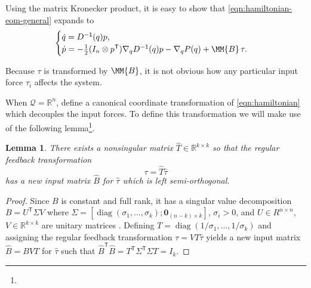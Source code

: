 \documentclass[journal,twoside,web, twocolumn,draftcls]{ieeecolor}
\newtheorem{lemma}{Lemma} %
\newtheorem{assm}{Assumption} %
\DeclareMathOperator{\Diag}{diag}
\newcommand*{\diag}[1]{\Diag\left(#1\right)}
\newcommand*{\tpose}{^\mathsf{T}}
\newcommand*{\inv}{^\mathsf{-1}}
\newcommand*{\R}{\mathbb{R}}
\newcommand*{\Id}[1]{I_{#1}}
\newcommand*{\Zmat}[1]{\bm{0}_{#1}}
\begin{document}
Using the matrix Kronecker product, it is easy to show that
\eqref{eqn:hamiltonian-eom-general} expands to
\begin{equation*}\label{eqn:hamiltonian-full-dynamics}
     \begin{cases}
        \dot{q} = D\inv(q)p 
        , \\
        \dot{p} = -\frac{1}{2} (\Id{n} \otimes p\tpose) \nabla_q D\inv(q) p
        - \nabla_q P(q) + \MM{B} \,\tau
        . \\
    \end{cases}
\end{equation*}

Because \(\tau\) is transformed by \(\MM{B}\), it is not obvious how any
particular input force \(\tau_i\) affects the system.

%
When \(\mathcal{Q} = \R^n\),  define a
canonical coordinate transformation of \eqref{eqn:hamiltonian} 
which decouples the input forces. To define this transformation we will make use of the following lemma\footnote{}.

\begin{lemma}\label{lemma:B-orthogonal}
There exists a nonsingular matrix \(\hat{T} \in \R^{k \times k}\) 
    so that the regular feedback transformation 
    \[
        \tau = \hat{T} \hat{\tau}
    \] 
    has a new input matrix \(\hat{B}\) for \(\hat{\tau}\) which is left
    semi-orthogonal.  
\end{lemma}
\begin{proof}
    Since \(B\) is constant and full rank, it has a singular value decomposition 
    \(B = U\tpose \Sigma V\) where 
    \(\Sigma = [\diag{\sigma_1,\ldots,\sigma_k}; \Zmat{(n-k)\times k}]\),
    \(\sigma_i > 0\), and \(U \in R^{n \times n}\),
    \(V \in \R^{k \times k}\) are unitary matrices \cite{calculating_svd}.
    Defining \(T = \diag{1/\sigma_1,\ldots,1/\sigma_k}\) and assigning the
    regular feedback transformation \(\tau = V T \hat{\tau}\) yields a new input
    matrix \(\hat{B} = B V T\) for \(\hat{\tau}\) such that
    \(\hat{B}\tpose \hat{B} = T\tpose \Sigma\tpose \Sigma T = \Id{k}\).
\end{proof}
\end{document}
